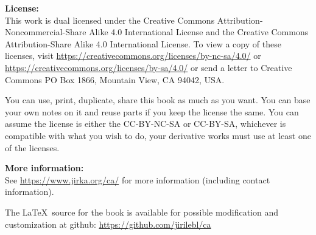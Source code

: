 \documentclass[12pt,openany]{book}
\theoremstyle{plain}
\theoremstyle{remark}
\theoremstyle{definition}
\theoremstyle{exercise}
\theoremstyle{example}
\begin{document}
\bigskip

\noindent
\textbf{License:}
\\
This work is dual licensed under
the Creative Commons
Attribution-Non\-commercial-Share Alike 4.0 International License and
the Creative Commons
Attribution-Share Alike 4.0 International License.
To view a
copy of these licenses, visit
\url{https://creativecommons.org/licenses/by-nc-sa/4.0/}
or
\url{https://creativecommons.org/licenses/by-sa/4.0/}
or send a letter to
Creative Commons
PO Box 1866, Mountain View, CA 94042, USA\@.

\bigskip

\noindent
You can use, print, duplicate, share this book as much as you want.  You can
base your own notes on it and reuse parts if you keep the license the
same.  You can assume the license is either the CC-BY-NC-SA or CC-BY-SA\@,
whichever is compatible with what you wish to do, your derivative works must
use at least one of the licenses.

%
%
%

\bigskip

\noindent
\textbf{More information:}
\\
See \url{https://www.jirka.org/ca/} for more information
(including contact information).

\medskip

\noindent
The \LaTeX\ source for the book is available
for possible modification and customization
at github: \url{https://github.com/jirilebl/ca}



\tableofcontents
{}


\end{document}
